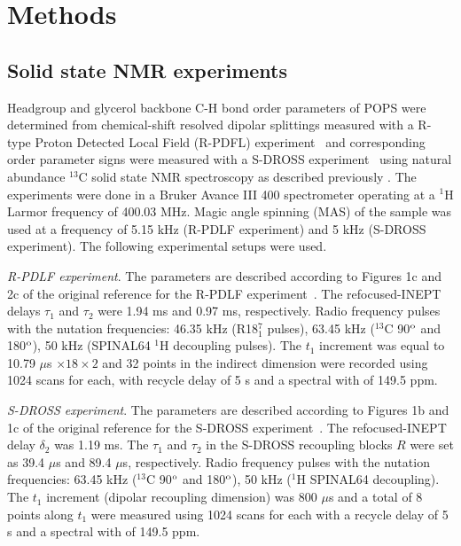 \documentclass[aps,prl,superscriptaddress,twocolumn]{revtex4}
\begin{document}
\begin{table}[!p]
 \end{table}

\section{Methods}

\subsection{Solid state NMR experiments}

Headgroup and glycerol backbone C-H bond order parameters of POPS
were determined from chemical-shift resolved dipolar splittings
measured with a R-type Proton Detected Local Field (R-PDFL) experiment~\cite{dvinskikh04}
and corresponding order parameter signs were measured with a S-DROSS experiment~\cite{gross97}
using natural abundance $^{13}$C solid state NMR spectroscopy as described previously \cite{ferreira13,ferreira16}.
The experiments were done in a Bruker Avance III 400 spectrometer operating at a $^1$H Larmor frequency of 400.03 MHz.
Magic angle spinning (MAS) of the sample was used at a frequency of 5.15 kHz (R-PDLF experiment) and 5 kHz (S-DROSS experiment).
The following experimental setups were used.

{\emph{R-PDLF experiment}}. The parameters are described according to Figures 1c and 2c of the original reference
for the R-PDLF experiment~\cite{dvinskikh04}.  The refocused-INEPT delays $\tau_1$ and $\tau_2$ were 1.94 ms and 0.97 ms, respectively.
Radio frequency pulses with the nutation frequencies: 46.35 kHz (R18$^7_1$ pulses), 63.45 kHz ($^{13}$C 90$^{\rm{o}}$ and 180$^{\rm{o}}$),
50 kHz (SPINAL64 $^1$H decoupling pulses). The $t_1$ increment was equal to 10.79 $\mu$s $\times18\times2$ and 32 points in the indirect
dimension were recorded using 1024 scans for each, with recycle delay of 5 s and a spectral with of 149.5 ppm.

\emph{S-DROSS experiment}. The parameters are described according to Figures 1b and 1c of the original reference for the S-DROSS
experiment~\cite{gross97}. The refocused-INEPT delay $\delta_2$ was 1.19 ms. The $\tau_1$ and $\tau_2$ in the S-DROSS recoupling
blocks $R$ were set as 39.4 $\mu$s and 89.4 $\mu$s, respectively. Radio frequency pulses with the nutation
frequencies: 63.45 kHz ($^{13}$C 90$^{\rm{o}}$ and 180$^{\rm{o}}$), 50 kHz ($^1$H SPINAL64 decoupling).
The $t_1$ increment (dipolar recoupling dimension) was 800 $\mu$s and a total of 8 points along $t_1$ were
measured using 1024 scans for each with a recycle delay of 5 s and a spectral with of 149.5 ppm.
\end{document}
